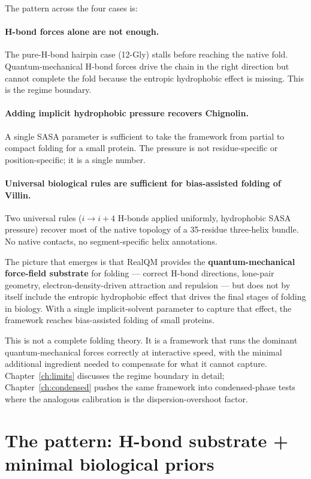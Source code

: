 The pattern across the four cases is:

\paragraph{H-bond forces alone are not enough.} The pure-H-bond hairpin case (12-Gly) stalls before reaching the native fold. Quantum-mechanical H-bond forces drive the chain in the right direction but cannot complete the fold because the entropic hydrophobic effect is missing. This is the regime boundary.

\paragraph{Adding implicit hydrophobic pressure recovers Chignolin.} A single SASA parameter is sufficient to take the framework from partial to compact folding for a small protein. The pressure is not residue-specific or position-specific; it is a single number.

\paragraph{Universal biological rules are sufficient for bias-assisted folding of Villin.} Two universal rules ($i \to i{+}4$ H-bonds applied uniformly, hydrophobic SASA pressure) recover most of the native topology of a 35-residue three-helix bundle. No native contacts, no segment-specific helix annotations.

The picture that emerges is that RealQM provides the \textbf{quantum-mechanical force-field substrate} for folding --- correct H-bond directions, lone-pair geometry, electron-density-driven attraction and repulsion --- but does not by itself include the entropic hydrophobic effect that drives the final stages of folding in biology. With a single implicit-solvent parameter to capture that effect, the framework reaches bias-assisted folding of small proteins.

This is not a complete folding theory. It is a framework that runs the dominant quantum-mechanical forces correctly at interactive speed, with the minimal additional ingredient needed to compensate for what it cannot capture. Chapter~\ref{ch:limits} discusses the regime boundary in detail; Chapter~\ref{ch:condensed} pushes the same framework into condensed-phase tests where the analogous calibration is the dispersion-overshoot factor.

\section{The pattern: H-bond substrate + minimal biological priors}\label{sec:fold-pattern}

